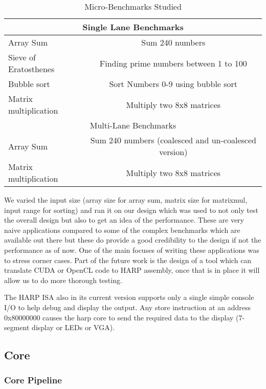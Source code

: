 \begin{table}[!htbp]
  \centering
  \begin{tabular}{|l|c|}
    \hline
    \multicolumn{2}{|c|}{Single Lane Benchmarks} \\
    \hline
Array Sum					&Sum 240 numbers \\
Sieve of Eratosthenes	&Finding prime numbers between 1 to 100\\
Bubble sort					&Sort Numbers 0-9 using bubble sort\\
Matrix multiplication	&Multiply two 8x8 matrices\\
    \hline
    \multicolumn{2}{|c|}{Multi-Lane Benchmarks} \\
    \hline
Array Sum					&Sum 240 numbers (coalesced and un-coalesced version) \\
Matrix multiplication	&Multiply two 8x8 matrices\\
    \hline
  \end{tabular}
  \caption{Micro-Benchmarks Studied}
  \label{table:apps}
\end{table}

We varied the input size (array size for array sum, matrix size for matrixmul, input range for sorting) and ran it on our design which was used to not only test the overall design but also to get an idea of the performance. These are very naive applications compared to some of the complex benchmarks which are available out there but these do provide a good credibility to the design if not the performance as of now. One of the main focuses of writing these applications was to stress corner cases. Part of the future work is the design of a tool which can translate CUDA or OpenCL code to HARP assembly, once that is in place it will allow us to do more thorough testing.

The HARP ISA also in its current version supports only a single simple console I/O to help debug and display the output. Any store instruction at an address 0x80000000 causes the harp core to send the required data to the display (7-segment display or LEDs or VGA).

\subsection{Core}
\subsubsection {Core Pipeline}

